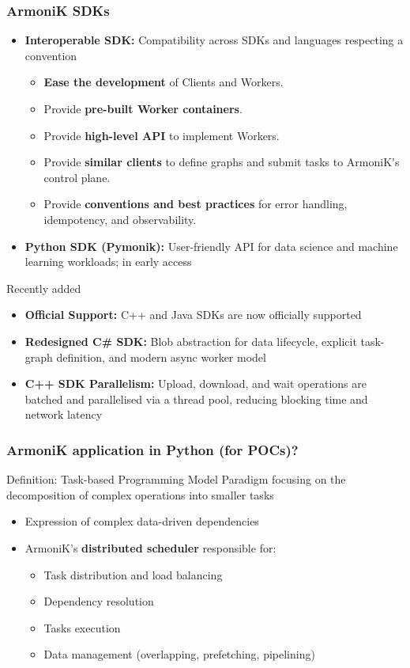 \begin{frame}
	\frametitle{ArmoniK SDKs}
	\begin{itemize}
		\item \textbf{Interoperable SDK:} Compatibility across SDKs and languages respecting a convention
		      \begin{itemize}
			      \item \textbf{Ease the development} of Clients and Workers.
			      \item Provide \textbf{pre-built Worker containers}.
			      \item Provide \textbf{high-level API} to implement Workers.
			      \item Provide \textbf{similar clients} to define graphs and submit tasks to ArmoniK's control plane.
			      \item Provide \textbf{conventions and best practices} for error handling, idempotency, and observability.
		      \end{itemize}
		\item \textbf{Python SDK (Pymonik):} User-friendly API for data science and machine learning workloads; in early access
	\end{itemize}
	\begin{block}{Recently added}
		\begin{itemize}
			\item \textbf{Official Support:} C++ and Java SDKs are now officially supported
			\item \textbf{Redesigned C\# SDK:} Blob abstraction for data lifecycle, explicit task-graph definition, and modern async worker model
			\item \textbf{C++ SDK Parallelism:} Upload, download, and wait operations are batched and parallelised via a thread pool, reducing blocking time and network latency
		\end{itemize}
	\end{block}
\end{frame}

\begin{frame}
	\frametitle{ArmoniK application in Python (for POCs)?}
	\begin{block}{Definition: Task-based Programming Model}
		Paradigm focusing on the decomposition of complex operations into smaller tasks
	\end{block}
	\begin{itemize}
		\item Expression of complex data-driven dependencies
		\item ArmoniK's \textbf{distributed scheduler} responsible for:
		      \begin{itemize}
			      \item Task distribution and load balancing
			      \item Dependency resolution
			      \item Tasks execution
			      \item Data management (overlapping, prefetching, pipelining)
		      \end{itemize}
	\end{itemize}
	\footnotesize
	\inputminted{python}{task-based-programming.py}
\end{frame}

